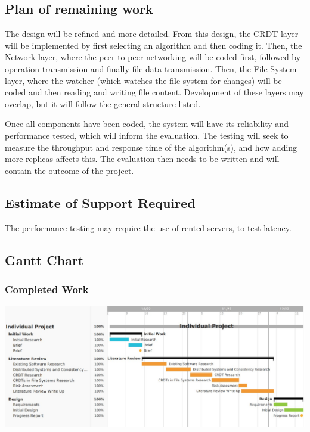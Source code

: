 \documentclass[12pt]{article}
\begin{document}
\subsection{Plan of remaining work}
The design will be refined and more detailed. From this design, the CRDT layer will be implemented by first selecting an algorithm and then coding it. Then, the Network layer, where the peer-to-peer networking will be coded first, followed by operation transmission and finally file data transmission. Then, the File System layer, where the watcher (which watches the file system for changes) will be coded and then reading and writing file content. Development of these layers may overlap, but it will follow the general structure listed. \par
Once all components have been coded, the system will have its reliability and performance tested, which will inform the evaluation. The testing will seek to measure the throughput and response time of the algorithm(s), and how adding more replicas affects this. The evaluation then needs to be written and will contain the outcome of the project.

\subsection{Estimate of Support Required}
The performance testing may require the use of rented servers, to test latency.

\subsection{Gantt Chart}

\subsubsection{Completed Work}
\includegraphics[width=16cm]{completed.jpg}
\end{document}
